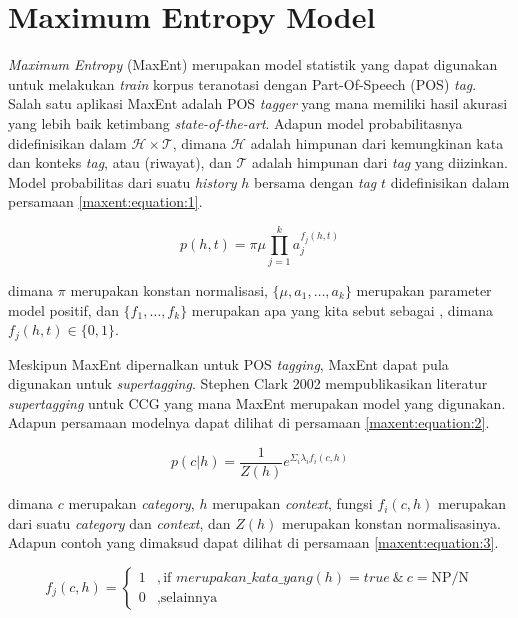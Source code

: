 \section{Maximum Entropy Model}
\textit{Maximum Entropy} (MaxEnt) merupakan model statistik yang dapat digunakan untuk
melakukan \textit{train} korpus teranotasi dengan Part-Of-Speech (POS) \textit{tag}.
Salah satu aplikasi MaxEnt adalah POS \textit{tagger} yang mana memiliki hasil akurasi
yang lebih baik ketimbang \textit{state-of-the-art}.
Adapun model probabilitasnya didefinisikan dalam $\mathcal{H}\times\mathcal{T}$,
dimana $\mathcal{H}$ adalah himpunan dari kemungkinan kata dan konteks \textit{tag},
atau  (riwayat), dan $\mathcal{T}$ adalah himpunan dari
\textit{tag} yang diizinkan.
Model probabilitas dari suatu \textit{history} $h$ bersama dengan \textit{tag} $t$
didefinisikan dalam persamaan \ref{maxent:equation:1}.

\begin{equation}\label{maxent:equation:1}
  p(h, t) = \pi\mu\prod_{j = 1}^{k} a_{j}^{f_{j}(h, t)}
\end{equation}

\noindent
dimana $\pi$ merupakan konstan normalisasi,
$\{\mu, a_1, \dots, a_k\}$ merupakan parameter model positif,
dan $\{f_1, \dots, f_k\}$ merupakan apa yang kita sebut sebagai
,
dimana $f_j(h, t) \in \{0, 1\}$.

Meskipun MaxEnt dipernalkan untuk POS \textit{tagging},
MaxEnt dapat pula digunakan untuk \textit{supertagging}.
Stephen Clark 2002 mempublikasikan literatur \textit{supertagging} untuk CCG yang
mana MaxEnt merupakan model yang digunakan.
Adapun persamaan modelnya dapat dilihat di persamaan \ref{maxent:equation:2}.

\begin{equation}\label{maxent:equation:2}
  p(c|h) = \frac{1}{Z(h)} e^{\Sigma_i \lambda_if_i(c, h)}
\end{equation}

\noindent
dimana $c$ merupakan \textit{category}, $h$ merupakan \textit{context},
fungsi $f_i(c, h)$ merupakan  dari suatu
\textit{category} dan \textit{context}, dan $Z(h)$ merupakan konstan normalisasinya.
Adapun contoh  yang dimaksud dapat dilihat di persamaan
\ref{maxent:equation:3}.

\begin{equation}\label{maxent:equation:3}
  f_j(c, h) =
  \begin{cases}
    1 &, \text{if } merupakan\_kata\_yang(h) = true\ \&\ c = \text{NP/N}\\
    0 &, \text{selainnya}
  \end{cases}
\end{equation}


